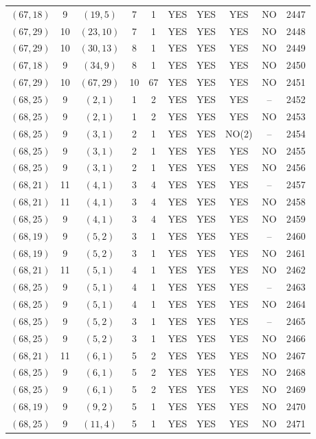 \begin{longtable}{|c|c|c|c|c|c|c|c|c|c|}
$(67, 18)$ & 9 & $(19, 5)$ & 7 & 1 & YES & YES & YES & NO & 2447\\
$(67, 29)$ & 10 & $(23, 10)$ & 7 & 1 & YES & YES & YES & NO & 2448\\
$(67, 29)$ & 10 & $(30, 13)$ & 8 & 1 & YES & YES & YES & NO & 2449\\
$(67, 18)$ & 9 & $(34, 9)$ & 8 & 1 & YES & YES & YES & NO & 2450\\
$(67, 29)$ & 10 & $(67, 29)$ & 10 & 67 & YES & YES & YES & NO & 2451\\
$(68, 25)$ & 9 & $(2, 1)$ & 1 & 2 & YES & YES & YES & -- & 2452\\
$(68, 25)$ & 9 & $(2, 1)$ & 1 & 2 & YES & YES & YES & NO & 2453\\
$(68, 25)$ & 9 & $(3, 1)$ & 2 & 1 & YES & YES & NO(2) & -- & 2454\\
$(68, 25)$ & 9 & $(3, 1)$ & 2 & 1 & YES & YES & YES & NO & 2455\\
$(68, 25)$ & 9 & $(3, 1)$ & 2 & 1 & YES & YES & YES & NO & 2456\\
$(68, 21)$ & 11 & $(4, 1)$ & 3 & 4 & YES & YES & YES & -- & 2457\\
$(68, 21)$ & 11 & $(4, 1)$ & 3 & 4 & YES & YES & YES & NO & 2458\\
$(68, 25)$ & 9 & $(4, 1)$ & 3 & 4 & YES & YES & YES & NO & 2459\\
$(68, 19)$ & 9 & $(5, 2)$ & 3 & 1 & YES & YES & YES & -- & 2460\\
$(68, 19)$ & 9 & $(5, 2)$ & 3 & 1 & YES & YES & YES & NO & 2461\\
$(68, 21)$ & 11 & $(5, 1)$ & 4 & 1 & YES & YES & YES & NO & 2462\\
$(68, 25)$ & 9 & $(5, 1)$ & 4 & 1 & YES & YES & YES & -- & 2463\\
$(68, 25)$ & 9 & $(5, 1)$ & 4 & 1 & YES & YES & YES & NO & 2464\\
$(68, 25)$ & 9 & $(5, 2)$ & 3 & 1 & YES & YES & YES & -- & 2465\\
$(68, 25)$ & 9 & $(5, 2)$ & 3 & 1 & YES & YES & YES & NO & 2466\\
$(68, 21)$ & 11 & $(6, 1)$ & 5 & 2 & YES & YES & YES & NO & 2467\\
$(68, 25)$ & 9 & $(6, 1)$ & 5 & 2 & YES & YES & YES & NO & 2468\\
$(68, 25)$ & 9 & $(6, 1)$ & 5 & 2 & YES & YES & YES & NO & 2469\\
$(68, 19)$ & 9 & $(9, 2)$ & 5 & 1 & YES & YES & YES & NO & 2470\\
$(68, 25)$ & 9 & $(11, 4)$ & 5 & 1 & YES & YES & YES & NO & 2471\\

\end{longtable}
